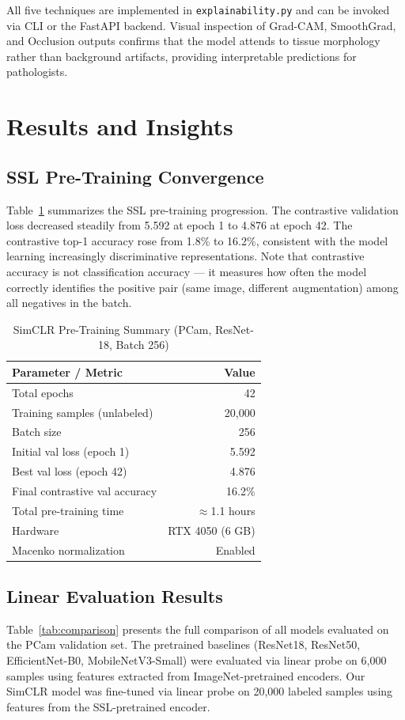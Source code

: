 \documentclass[conference]{IEEEtran}
\begin{document}
All five techniques are implemented in \texttt{explainability.py} and can be invoked via CLI or the FastAPI backend. Visual inspection of Grad-CAM, SmoothGrad, and Occlusion outputs confirms that the model attends to tissue morphology rather than background artifacts, providing interpretable predictions for pathologists.

\section{Results and Insights}

\subsection{SSL Pre-Training Convergence}
Table~\ref{tab:ssl_training} summarizes the SSL pre-training progression. The contrastive validation loss decreased steadily from 5.592 at epoch 1 to 4.876 at epoch 42. The contrastive top-1 accuracy rose from 1.8\% to 16.2\%, consistent with the model learning increasingly discriminative representations. Note that contrastive accuracy is not classification accuracy — it measures how often the model correctly identifies the positive pair (same image, different augmentation) among all negatives in the batch.

\begin{table}[htbp]
\centering
\caption{SimCLR Pre-Training Summary (PCam, ResNet-18, Batch 256)}
\label{tab:ssl_training}
\begin{tabular}{l r}
\toprule
\textbf{Parameter / Metric} & \textbf{Value} \\
\midrule
Total epochs & 42 \\
Training samples (unlabeled) & 20,000 \\
Batch size & 256 \\
Initial val loss (epoch 1) & 5.592 \\
Best val loss (epoch 42) & 4.876 \\
Final contrastive val accuracy & 16.2\% \\
Total pre-training time & $\approx$1.1 hours \\
Hardware & RTX 4050 (6 GB) \\
Macenko normalization & Enabled \\
\bottomrule
\end{tabular}
\end{table}

\subsection{Linear Evaluation Results}
Table~\ref{tab:comparison} presents the full comparison of all models evaluated on the PCam validation set. The pretrained baselines (ResNet18, ResNet50, EfficientNet-B0, MobileNetV3-Small) were evaluated via linear probe on 6,000 samples using features extracted from ImageNet-pretrained encoders. Our SimCLR model was fine-tuned via linear probe on 20,000 labeled samples using features from the SSL-pretrained encoder.
\end{document}
